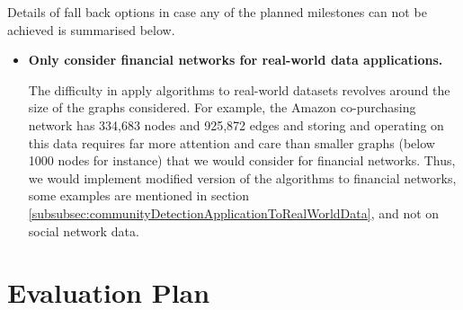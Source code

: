 \documentclass[12pt]{article}
\numberwithin{equation}{section}
\begin{document}
Details of fall back options in case any of the planned milestones can not be achieved is summarised below.
\begin{itemize}
	\item \textbf{Only consider financial networks for real-world data applications.}

	The difficulty in apply algorithms to real-world datasets revolves around the size of the graphs considered. For example, the Amazon co-purchasing network has 334,683 nodes and 925,872 edges and storing and operating on this data requires far more attention and care than smaller graphs (below 1000 nodes for instance) that we would consider for financial networks. Thus, we would implement modified version of the algorithms to financial networks, some examples are mentioned in section \ref{subsubsec:communityDetectionApplicationToRealWorldData}, and not on social network data.
\end{itemize}


\newpage
\thispagestyle{plain}
\mbox{}
\section {Evaluation Plan}
\label{sec:evaluationPlan}


\newpage
\thispagestyle{plain}
\mbox{}



\end{document}
